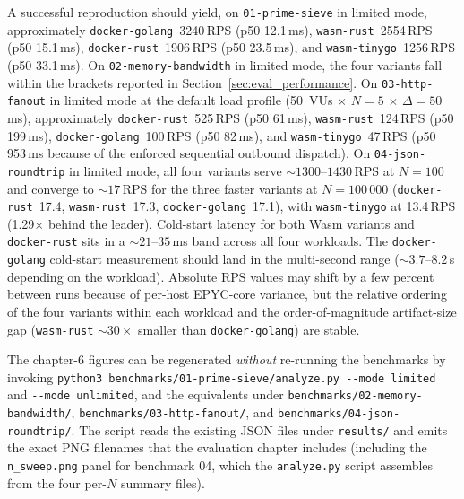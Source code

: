 \begin{sloppypar}
A successful reproduction should yield, on \texttt{01-prime-sieve} in limited mode, approximately \texttt{docker-golang}~3240\,\acs{RPS} (p50 12.1\,ms), \texttt{wasm-rust}~2554\,\acs{RPS} (p50 15.1\,ms), \texttt{docker-rust}~1906\,\acs{RPS} (p50 23.5\,ms), and \texttt{wasm-tinygo}~1256\,\acs{RPS} (p50 33.1\,ms). On \texttt{02-memory-bandwidth} in limited mode, the four variants fall within the brackets reported in Section~\ref{sec:eval_performance}. On \texttt{03-http-fanout} in limited mode at the default load profile (50~\acp{VU} $\times$ $N=5$ $\times$ $\Delta=50$\,ms), approximately \texttt{docker-rust}~525\,\acs{RPS} (p50 61\,ms), \texttt{wasm-rust}~124\,\acs{RPS} (p50 199\,ms), \texttt{docker-golang}~100\,\acs{RPS} (p50 82\,ms), and \texttt{wasm-tinygo}~47\,\acs{RPS} (p50 953\,ms because of the enforced sequential outbound dispatch). On \texttt{04-json-roundtrip} in limited mode, all four variants serve ${\sim}1300$--$1430$\,\acs{RPS} at $N=100$ and converge to ${\sim}17$\,\acs{RPS} for the three faster variants at $N=100\,000$ (\texttt{docker-rust}~17.4, \texttt{wasm-rust}~17.3, \texttt{docker-golang}~17.1), with \texttt{wasm-tinygo} at 13.4\,\acs{RPS} (1.29$\times$ behind the leader). Cold-start latency for both \acs{Wasm} variants and \texttt{docker-rust} sits in a ${\sim}21$--$35$\,ms band across all four workloads. The \texttt{docker-golang} cold-start measurement should land in the multi-second range (${\sim}3.7$--$8.2$\,s depending on the workload). Absolute \acs{RPS} values may shift by a few percent between runs because of per-host EPYC-core variance, but the relative ordering of the four variants within each workload and the order-of-magnitude artifact-size gap (\texttt{wasm-rust} ${\sim}30\times$ smaller than \texttt{docker-golang}) are stable.
\end{sloppypar}

\begin{sloppypar}
The chapter-6 figures can be regenerated \emph{without} re-running the benchmarks by invoking \texttt{python3 benchmarks/01-prime-sieve/analyze.py -{}-mode limited} and \texttt{-{}-mode unlimited}, and the equivalents under \texttt{benchmarks/02-memory-bandwidth/}, \texttt{benchmarks/03-http-fanout/}, and \texttt{benchmarks/04-json-roundtrip/}. The script reads the existing \acs{JSON} files under \texttt{results/} and emits the exact PNG filenames that the evaluation chapter includes (including the \texttt{n\_sweep.png} panel for benchmark 04, which the \texttt{analyze.py} script assembles from the four per-$N$ summary files).
\end{sloppypar}

